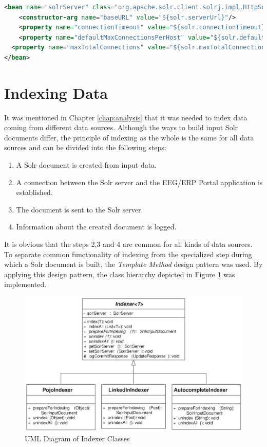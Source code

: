 \begin{lstlisting}[language=XML, caption={Configuration of the Solr Server Bean.}, label={listing:solrBeanConf}]
<bean name="solrServer" class="org.apache.solr.client.solrj.impl.HttpSolrServer">
	<constructor-arg name="baseURL" value="${solr.serverUrl}"/>
	<property name="connectionTimeout" value="${solr.connectionTimeout}"/>
	<property name="defaultMaxConnectionsPerHost" value="${solr.defaultMaxConnectionsPerHost}"/>
  <property name="maxTotalConnections" value="${solr.maxTotalConnections}"/>
</bean>
\end{lstlisting}

\section{Indexing Data}

It was mentioned in Chapter \ref{chap:analysis} that it was needed to index data coming from different data sources.
Although the ways to build input Solr documents differ, the principle of indexing as the whole is the same for all data sources and can be divided into the following steps:

\begin{enumerate}
	\item A Solr document is created from input data.
	\item A connection between the Solr server and the EEG/ERP Portal application is established.
	\item The document is sent to the Solr server.
	\item Information about the created document is logged.
\end{enumerate}

It is obvious that the steps 2,3 and 4 are common for all kinds of data sources.
To separate common functionality of indexing from the specialized step during which a Solr document is built, the \textit{Template Method} design pattern \cite{GOF:DesignPatterns} was used.
By applying this design pattern, the class hierarchy depicted in Figure \ref{fig:indexersUml} was implemented.

\begin{figure}[h]
	\centering
		\includegraphics{figures/indexersUml.eps}
	\caption{UML Diagram of Indexer Classes}
	\label{fig:indexersUml}
\end{figure}

